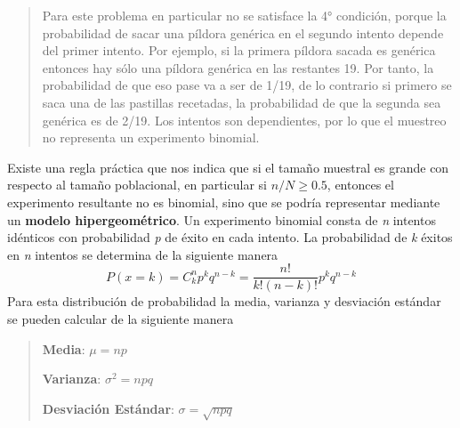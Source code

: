 \documentclass[]{article}
\begin{document}
\begin{quote}
 	Para este problema en particular no se satisface la 4° condición, porque la probabilidad de sacar una píldora genérica en el segundo intento depende del primer intento. Por ejemplo, si la primera píldora sacada es genérica entonces hay sólo una píldora genérica en las restantes 19. Por tanto, la probabilidad de que eso pase va a ser de 1/19, de lo contrario si primero se saca una de las pastillas recetadas, la probabilidad de que la segunda sea genérica es de 2/19. Los intentos son dependientes, por lo que el muestreo no representa un experimento binomial.
 \end{quote}
 Existe una regla práctica que nos indica que si el tamaño muestral es grande con respecto al tamaño poblacional, en particular si $n/N \geq 0.5$, entonces el experimento resultante no es binomial, sino que se podría representar mediante un \textbf{modelo hipergeométrico}. \newline
 Un experimento binomial consta de \textit{n} intentos idénticos con probabilidad \textit{p} de éxito en cada intento. La probabilidad de \textit{k} éxitos en \textit{n} intentos se determina de la siguiente manera
 \[ P(x = k) = C^n_kp^kq^{n-k} = \frac{n!}{k!(n-k)!}p^kq^{n-k} \]
 Para esta distribución de probabilidad la media, varianza y desviación estándar se pueden calcular de la siguiente manera
 \begin{quote}
 	\item \textbf{Media}: $\mu = np$
 	\item \textbf{Varianza}: $\sigma^2 = npq$
 	\item \textbf{Desviación Estándar}: $\sigma = \sqrt{npq}$
 \end{quote}
\end{document}
